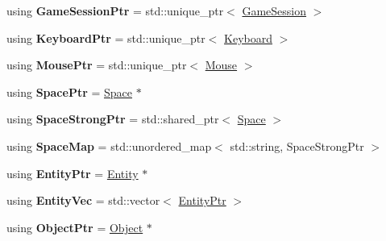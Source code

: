 \begin{DoxyCompactItemize}
\item 
\hypertarget{namespaceDCEngine_a1e0f9c97553be5cc609af82c337294e7}{using {\bfseries Game\-Session\-Ptr} = std\-::unique\-\_\-ptr$<$ \hyperlink{classDCEngine_1_1GameSession}{Game\-Session} $>$}\label{namespaceDCEngine_a1e0f9c97553be5cc609af82c337294e7}

\item 
\hypertarget{namespaceDCEngine_a3a9d382fdb5de71c8861c518f5d01262}{using {\bfseries Keyboard\-Ptr} = std\-::unique\-\_\-ptr$<$ \hyperlink{classDCEngine_1_1Keyboard}{Keyboard} $>$}\label{namespaceDCEngine_a3a9d382fdb5de71c8861c518f5d01262}

\item 
\hypertarget{namespaceDCEngine_a7f30f74918faec82305eb37e1e5788ea}{using {\bfseries Mouse\-Ptr} = std\-::unique\-\_\-ptr$<$ \hyperlink{classDCEngine_1_1Mouse}{Mouse} $>$}\label{namespaceDCEngine_a7f30f74918faec82305eb37e1e5788ea}

\item 
\hypertarget{namespaceDCEngine_acb43045fbe3e8b58659b15567ee6ea81}{using {\bfseries Space\-Ptr} = \hyperlink{classDCEngine_1_1Space}{Space} $\ast$}\label{namespaceDCEngine_acb43045fbe3e8b58659b15567ee6ea81}

\item 
\hypertarget{namespaceDCEngine_a82728633ab6c1f05aaa73360fa6966b4}{using {\bfseries Space\-Strong\-Ptr} = std\-::shared\-\_\-ptr$<$ \hyperlink{classDCEngine_1_1Space}{Space} $>$}\label{namespaceDCEngine_a82728633ab6c1f05aaa73360fa6966b4}

\item 
\hypertarget{namespaceDCEngine_a4e791d1e5562a071a54b4d0f4b139d1e}{using {\bfseries Space\-Map} = std\-::unordered\-\_\-map$<$ std\-::string, Space\-Strong\-Ptr $>$}\label{namespaceDCEngine_a4e791d1e5562a071a54b4d0f4b139d1e}

\item 
\hypertarget{namespaceDCEngine_a168258d320ced60e290e9c3fb5d5bbba}{using {\bfseries Entity\-Ptr} = \hyperlink{classDCEngine_1_1Entity}{Entity} $\ast$}\label{namespaceDCEngine_a168258d320ced60e290e9c3fb5d5bbba}

\item 
\hypertarget{namespaceDCEngine_a2c7646cec3086843b0dd5d63dbd70cac}{using {\bfseries Entity\-Vec} = std\-::vector$<$ \hyperlink{classDCEngine_1_1Entity}{Entity\-Ptr} $>$}\label{namespaceDCEngine_a2c7646cec3086843b0dd5d63dbd70cac}

\item 
\hypertarget{namespaceDCEngine_a7dd0d927ce60f5d94af00b97af97c317}{using {\bfseries Object\-Ptr} = \hyperlink{classDCEngine_1_1Object}{Object} $\ast$}\label{namespaceDCEngine_a7dd0d927ce60f5d94af00b97af97c317}


\end{DoxyCompactItemize}
